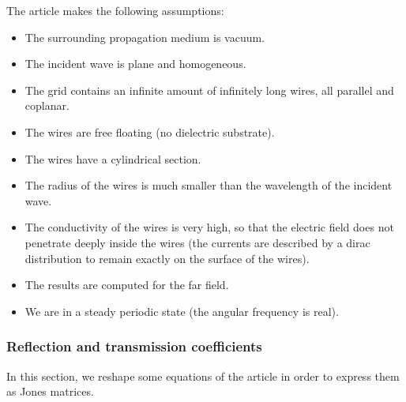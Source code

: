 The article makes the following assumptions:
\begin{itemize}
    \item The surrounding propagation medium is vacuum.
    \item The incident wave is plane and homogeneous.
    \item The grid contains an infinite amount of infinitely long wires, all parallel and coplanar.
    \item The wires are free floating (no dielectric substrate).
    \item The wires have a cylindrical section.
    \item The radius of the wires is much smaller than the wavelength of the incident wave.
    \item The conductivity of the wires is very high, so that the electric field does not penetrate deeply inside the wires (the currents are described by a dirac distribution to remain exactly on the surface of the wires).
    \item The results are computed for the far field.
    \item We are in a steady periodic state (the angular frequency is real).
\end{itemize}

\subsubsection{Reflection and transmission coefficients}
In this section, we reshape some equations of the article in order to express them as Jones matrices.

